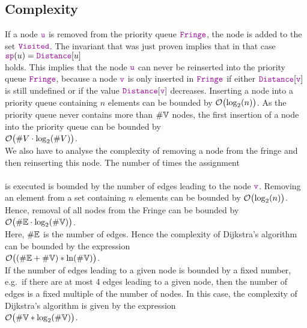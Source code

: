\subsection{Complexity}
If a node $\mytt{u}$ is removed from the priority queue $\mytt{Fringe}$, the node is added to the set
$\mytt{Visited}$.  The invariant that was just proven implies that in that case
\\[0.2cm]
\hspace*{1.3cm}
$\mytt{sp}(u) = \mytt{Distance}[u]$
\\[0.2cm]
holds.  This implies that the node $\mytt{u}$ can never be reinserted into the priority queue
$\mytt{Fringe}$, because a node $\mytt{v}$ is only inserted in $\mytt{Fringe}$ if either 
 $\mytt{Distance}[\mytt{v}]$ is still undefined or if  the  value $\mytt{Distance}[\mytt{v}]$ decreases.  
Inserting a node into a priority queue containing  $n$ elements can be bounded by
$\mathcal{O}\bigl(\log_2(n)\bigr)$.  As the priority queue never contains more than $\#{\mathbb V}$ nodes,
the first insertion of a node into the priority queue can be bounded by
\\[0.2cm]
\hspace*{1.3cm}
$\mathcal{O}\bigl(\#V \cdot \log_2(\#V)\bigr)$.
\\[0.2cm]
We also have to analyse the complexity of removing a node from the fringe and then reinserting this node.
The number of times the assignment
\\[0.2cm]
\hspace*{1.3cm}
\\[0.2cm]
is executed is bounded by the number of edges leading to the node $\mytt{v}$.
Removing an element from a set containing $n$ elements can be bounded by
 $\mathcal{O}\bigl(\log_2(n)\bigr)$.  Hence, removal of all nodes from the Fringe can be bounded by
\\[0.2cm]
\hspace*{1.3cm}
$\mathcal{O}\bigl(\#{\mathbb E} \cdot \log_2(\#{\mathbb V})\bigr)$.
\\[0.2cm]
Here,  $\#{\mathbb E}$ is the number of edges.  Hence the complexity of Dijkstra's algorithm can be
bounded by the expression \\[0.2cm]
\hspace*{1.3cm} $\mathcal{O}\bigl((\#{\mathbb E} + \#{\mathbb V}) * \ln(\#{\mathbb V})\bigr)$. \\[0.2cm]
If the number of edges leading  to a given node is bounded by a fixed number, e.g.~if there
are at most 4 edges leading to a given node, then the number of edges is a fixed multiple of the
number of nodes.  In this case, the complexity of 
 Dijkstra's algorithm is given by the expression  
\\[0.2cm]
\hspace*{1.3cm}
$\mathcal{O}\bigl(\#{\mathbb V} * \log_2(\#{\mathbb V})\bigr)$.

